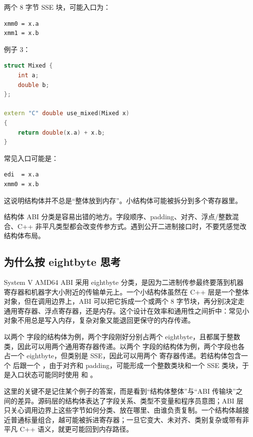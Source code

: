 两个 8 字节 SSE 块，可能入口为：

\begin{lstlisting}
xmm0 = x.a
xmm1 = x.b
\end{lstlisting}

例子 3：

\begin{lstlisting}[language=C++]
struct Mixed {
    int a;
    double b;
};

extern "C" double use_mixed(Mixed x)
{
    return double(x.a) + x.b;
}
\end{lstlisting}

常见入口可能是：

\begin{lstlisting}
edi  = x.a
xmm0 = x.b
\end{lstlisting}

这说明结构体并不总是“整体放到内存”。小结构体可能被拆分到多个寄存器里。

\begin{warningbox}
结构体 ABI 分类是容易出错的地方。字段顺序、padding、对齐、浮点/整数混合、C++ 非平凡类型都会改变传参方式。遇到公开二进制接口时，不要凭感觉改结构体布局。
\end{warningbox}

\subsection{为什么按 eightbyte 思考}

System V AMD64 ABI 采用 eightbyte 分类，是因为二进制传参最终要落到机器寄存器和机器字大小附近的传输单元上。一个小结构体虽然在 C++ 层是一个整体对象，但在调用边界上，ABI 可以把它拆成一个或两个 8 字节块，再分别决定走通用寄存器、浮点寄存器，还是内存。这个设计在效率和通用性之间折中：常见小对象不用总是写入内存，复杂对象又能退回更保守的内存传递。

以两个  字段的结构体为例，两个字段刚好分别占两个 eightbyte，且都属于整数类，因此可以用两个通用寄存器传递。以两个  字段的结构体为例，两个字段也各占一个 eightbyte，但类别是 SSE，因此可以用两个  寄存器传递。若结构体包含一个  后跟一个 ，由于对齐和 padding，可能形成一个整数类块和一个 SSE 类块，于是入口状态可能同时使用  和 。

这里的关键不是记住某个例子的答案，而是看到“结构体整体”与“ABI 传输块”之间的差异。源码层的结构体表达了字段关系、类型不变量和程序员意图；ABI 层只关心调用边界上这些字节如何分类、放在哪里、由谁负责复制。一个结构体越接近普通标量组合，越可能被拆进寄存器；一旦它变大、未对齐、类别复杂或带有非平凡 C++ 语义，就更可能回到内存路径。

